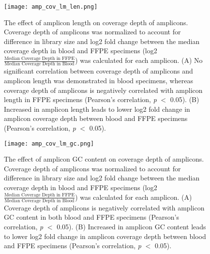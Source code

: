 
\begin{figure}[H]
	\centering
	\texttt{[image: amp\_cov\_lm\_len.png]}
	\caption{The effect of amplicon length on coverage depth of amplicons. Coverage depth of amplicons was normalized to account for difference in library size and log2 fold change between the median coverage depth in blood and FFPE specimens (log2\( \frac{\text{Median Coverage Depth in FFPE}}{\text{Median Coverage Depth in Blood}} \)) was calculated for each amplicon. (A) No significant correlation between coverage depth of amplicons and amplicon length was demonstrated in blood specimens, whereas coverage depth of amplicons is negatively correlated with amplicon length in FFPE specimens (Pearson's correlation, \textit{p} $<$ 0.05). (B) Increased in amplicon length leads to lower log2 fold change in amplicon coverage depth between blood and FFPE specimens (Pearson's correlation, \textit{p} $<$ 0.05).}
	\label{fig:amp_cov_lm_len}
\end{figure}


\begin{figure}[H]
	\centering
	\texttt{[image: amp\_cov\_lm\_gc.png]}
	\caption{The effect of amplicon GC content on coverage depth of amplicons. Coverage depth of amplicons was normalized to account for difference in library size and log2 fold change between the median coverage depth in blood and FFPE specimens (log2\( \frac{\text{Median Coverage Depth in FFPE}}{\text{Median Coverage Depth in Blood}} \)) was calculated for each amplicon. (A) Coverage depth of amplicons is negatively correlated with amplicon GC content in both blood and FFPE specimens (Pearson's correlation, \textit{p} $<$ 0.05). (B) Increased in amplicon GC content leads to lower log2 fold change in amplicon coverage depth between blood and FFPE specimens (Pearson's correlation, \textit{p} $<$ 0.05).}
	\label{fig:amp_cov_lm_gc}
\end{figure}
